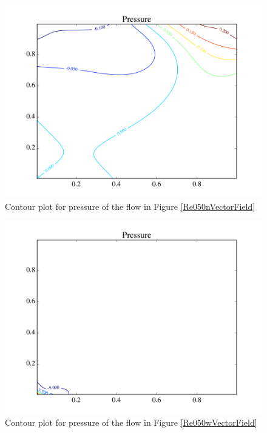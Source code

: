 \documentclass[journal]{IEEEtran}
\begin{document}
\begin{figure}[!t]
\centering
\includegraphics[width=\linewidth]{figures/Re050/n/pressure}
\caption{Contour plot for pressure of the flow in Figure \ref{Re050nVectorField}\label{Re050nPressure}}
\end{figure}


\begin{figure}[!t]
\centering
\includegraphics[width=\linewidth]{figures/Re050/w/pressure}
\caption{Contour plot for pressure of the flow in Figure \ref{Re050wVectorField} \label{Re050wPressure}}
\end{figure}
\end{document}
